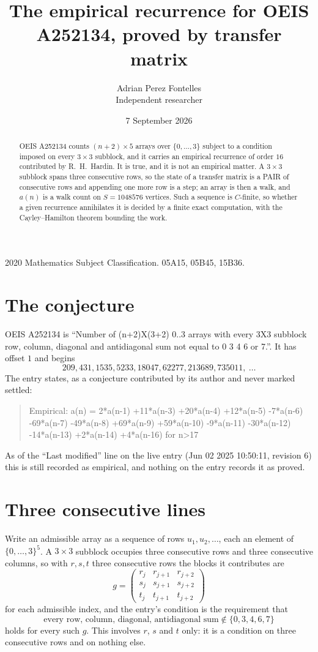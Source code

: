 \documentclass[11pt,a4paper]{article}
\title{The empirical recurrence for OEIS A252134, proved by transfer matrix}
\author{Adrian Perez Fontelles\\ \small Independent researcher}
\date{7 September 2026}
\theoremstyle{plain}
\theoremstyle{definition}
\begin{document}
\maketitle

\begin{abstract}
OEIS A252134 counts $(n+2)\times5$ arrays over $\{0,\dots,3\}$ subject to a condition imposed on
every $3\times3$ subblock, and it carries an empirical recurrence of order $16$
contributed by R.~H.~Hardin. It is true, and it is not an empirical matter. A $3\times3$
subblock spans three consecutive rows, so the state of a transfer matrix is a PAIR of
consecutive rows and appending one more row is a step; an array is then a walk, and
$a(n)$ is a walk count on $S=1048576$ vertices. Such a sequence is $C$-finite, so whether a given
recurrence annihilates it is decided by a finite exact computation, with the Cayley--Hamilton
theorem bounding the work.
\end{abstract}

\noindent\small 2020 Mathematics Subject Classification. 05A15, 05B45, 15B36.\normalsize

\section{The conjecture}

OEIS A252134 is ``Number of (n+2)X(3+2) 0..3 arrays with every 3X3 subblock row, column, diagonal and antidiagonal sum not equal to 0 3 4 6 or 7.''. It has offset $1$ and begins
\[
209, 431, 1535, 5233, 18047, 62277, 213689, 735011,\ \dots
\]
The entry states, as a conjecture contributed by its author and never marked settled:
\begin{quote}
Empirical: a(n) = 2*a(n-1) +11*a(n-3) +20*a(n-4) +12*a(n-5) -7*a(n-6) -69*a(n-7) -49*a(n-8) +69*a(n-9) +59*a(n-10) -9*a(n-11) -30*a(n-12) -14*a(n-13) +2*a(n-14) +4*a(n-16) for n>17
\end{quote}
As of the ``Last modified'' line on the live entry (Jun 02 2025 10:50:11, revision 6) this is still
recorded as empirical, and nothing on the entry records it as proved.

\section{Three consecutive lines}

Write an admissible array as a sequence of rows $u_1,u_2,\dots$, each an element of
$\{0,\dots,3\}^{5}$. A $3\times3$ subblock occupies three consecutive rows and
three consecutive columns, so with $r,s,t$ three consecutive rows the blocks it
contributes are
\[
g=\begin{pmatrix}r_j&r_{j+1}&r_{j+2}\\ s_j&s_{j+1}&s_{j+2}\\ t_j&t_{j+1}&t_{j+2}\end{pmatrix}
\]
for each admissible index, and the entry's condition is the requirement that
\[
\text{every row, column, diagonal, antidiagonal sum} \notin \{0,3,4,6,7\}
\]
holds for every such $g$. This involves $r$, $s$ and $t$ only: it is a condition on
three consecutive rows and on nothing else.
\end{document}
